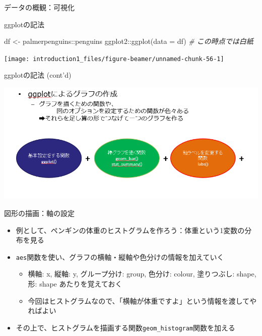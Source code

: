\documentclass[
  ignorenonframetext,
]{beamer}
\newenvironment{Shaded}{\begin{snugshade}}{\end{snugshade}}
\newcommand{\AttributeTok}[1]{\textcolor[rgb]{0.77,0.63,0.00}{#1}}
\newcommand{\CommentTok}[1]{\textcolor[rgb]{0.56,0.35,0.01}{\textit{#1}}}
\newcommand{\FunctionTok}[1]{\textcolor[rgb]{0.00,0.00,0.00}{#1}}
\newcommand{\NormalTok}[1]{#1}
\newcommand{\OtherTok}[1]{\textcolor[rgb]{0.56,0.35,0.01}{#1}}
\newcommand{\SpecialCharTok}[1]{\textcolor[rgb]{0.00,0.00,0.00}{#1}}
\providecommand{\tightlist}{%
  \setlength{\itemsep}{0pt}\setlength{\parskip}{0pt}}
\begin{document}
\begin{frame}[fragile]{データの概観：可視化}
\begin{block}{ggplotの記法}
\begin{Shaded}
\begin{Highlighting}[]
\NormalTok{df }\OtherTok{\textless{}{-}}\NormalTok{ palmerpenguins}\SpecialCharTok{::}\NormalTok{penguins}
\NormalTok{ggplot2}\SpecialCharTok{::}\FunctionTok{ggplot}\NormalTok{(}\AttributeTok{data =}\NormalTok{ df) }\CommentTok{\# この時点では白紙}
\end{Highlighting}
\end{Shaded}

\begin{center}\texttt{[image: introduction1\_files/figure-beamer/unnamed-chunk-56-1]} \end{center}
\end{block}

\begin{block}{ggplotの記法 (cont'd)}
\protect\hypertarget{ggplotux306eux8a18ux6cd5-contd}{}
\begin{center}\includegraphics[width=0.8\linewidth]{figs/ggplot_fig} \end{center}
\end{block}

\begin{block}{図形の描画：軸の設定}
\protect\hypertarget{ux56f3ux5f62ux306eux63cfux753bux8ef8ux306eux8a2dux5b9a}{}
\begin{itemize}
\tightlist
\item
  例として、ペンギンの体重のヒストグラムを作ろう：体重という1変数の分布を見る
\item
  \texttt{aes}関数を使い、グラフの横軸・縦軸や色分けの情報を加えていく

  \begin{itemize}
  \tightlist
  \item
    横軸: x, 縦軸: y, グループ分け: group, 色分け: colour, 塗りつぶし:
    shape, 形: shape あたりを覚えておく
  \item
    今回はヒストグラムなので、「横軸が体重ですよ」という情報を渡してやればよい
  \end{itemize}
\item
  その上で、ヒストグラムを描画する関数\texttt{geom\_histogram}関数を加える
\end{itemize}
\end{block}


\end{frame}
\end{document}
